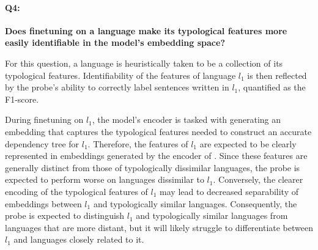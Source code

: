 		\paragraph{Q4:} \textbf{Does finetuning on a language make its typological features more easily identifiable in the model's embedding space?}

		For this question, a language is heuristically taken to be a collection of its typological features. Identifiability of the features of language $l_1$ is then reflected by the probe's ability to correctly label sentences written in $l_1$, quantified as the F1-score.

		During finetuning on $l_1$, the model's encoder is tasked with generating an embedding that captures the typological features needed to construct an accurate dependency tree for $l_1$. Therefore, the features of $l_1$ are expected to be clearly represented in embeddings generated by the encoder of . Since these features are generally distinct from those of typologically dissimilar languages, the probe is expected to perform worse on languages dissimilar to $l_1$. Conversely, the clearer encoding of the typological features of $l_1$ may lead to decreased separability of embeddings between $l_1$ and typologically similar languages. Consequently, the probe is expected to distinguish $l_1$ and typologically similar languages from languages that are more distant, but it will likely struggle to differentiate between $l_1$ and languages closely related to it.

